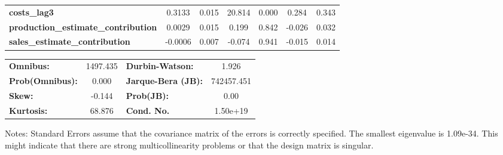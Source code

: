 \begin{center}
\begin{tabular}{lcccccc}
\textbf{costs\_lag3}                        &       0.3133  &        0.015     &    20.814  &         0.000        &        0.284    &        0.343     \\
\textbf{production\_estimate\_contribution} &       0.0029  &        0.015     &     0.199  &         0.842        &       -0.026    &        0.032     \\
\textbf{sales\_estimate\_contribution}      &      -0.0006  &        0.007     &    -0.074  &         0.941        &       -0.015    &        0.014     \\
\bottomrule
\end{tabular}
\begin{tabular}{lclc}
\textbf{Omnibus:}       & 1497.435 & \textbf{  Durbin-Watson:     } &     1.926   \\
\textbf{Prob(Omnibus):} &   0.000  & \textbf{  Jarque-Bera (JB):  } & 742457.451  \\
\textbf{Skew:}          &  -0.144  & \textbf{  Prob(JB):          } &      0.00   \\
\textbf{Kurtosis:}      &  68.876  & \textbf{  Cond. No.          } &  1.50e+19   \\
\bottomrule
\end{tabular}
\end{center}

Notes: \newline
 [1] Standard Errors assume that the covariance matrix of the errors is correctly specified. \newline
 [2] The smallest eigenvalue is 1.09e-34. This might indicate that there are \newline
 strong multicollinearity problems or that the design matrix is singular.